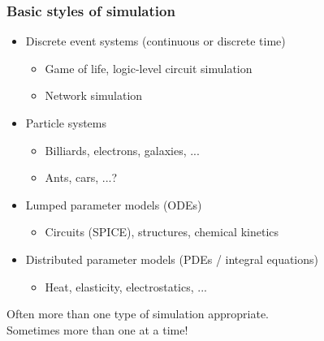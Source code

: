 \documentclass{beamer}
\begin{document}
\begin{frame}
  \frametitle{Basic styles of simulation}

  \begin{itemize}
  \item Discrete event systems (continuous or discrete time)
    \begin{itemize}
    \item Game of life, logic-level circuit simulation
    \item Network simulation
    \end{itemize}
  \item Particle systems
    \begin{itemize}
    \item Billiards, electrons, galaxies, ...
    \item Ants, cars, ...?
    \end{itemize}
  \item Lumped parameter models (ODEs)
    \begin{itemize}
    \item Circuits (SPICE), structures, chemical kinetics
    \end{itemize}
  \item Distributed parameter models (PDEs / integral equations)
    \begin{itemize}
    \item Heat, elasticity, electrostatics, ...
    \end{itemize}
  \end{itemize}
  Often more than one type of simulation appropriate. \\
  Sometimes more than one at a time!

\end{frame}
\end{document}
